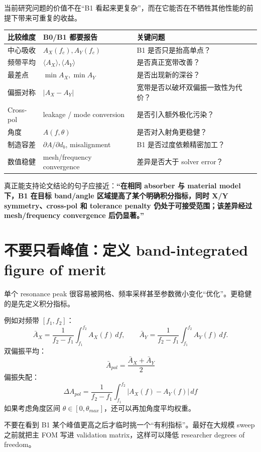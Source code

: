\documentclass[11pt,a4paper,openany]{ctexrep}
\begin{document}
当前研究问题的价值不在“B1 看起来更复杂”，而在它能否在不牺牲其他性能的前提下带来可重复的收益。

\begin{center}
\begin{tabularx}{\textwidth}{p{3.3cm}X X}
\toprule
比较维度 & B0/B1 都要报告 & 关键问题 \\
\midrule
中心吸收 & $A_X(f_c),A_Y(f_c)$ & B1 是否只是抬高单点？ \\
频带平均 & $\langle A_X\rangle,\langle A_Y\rangle$ & 是否真正宽带改善？ \\
最差点 & $\min A_X,\min A_Y$ & 是否出现新的深谷？ \\
偏振对称 & $|A_X-A_Y|$ & 宽带是否以破坏双偏振一致性为代价？ \\
Cross-pol & leakage / mode conversion & 是否引入额外极化污染？ \\
角度 & $A(f,\theta)$ & 是否对入射角更稳健？ \\
制造容差 & $\partial A/\partial d_b$, misalignment & B1 是否过度依赖精密加工？ \\
数值稳健 & mesh/frequency convergence & 差异是否大于 solver error？ \\
\bottomrule
\end{tabularx}
\end{center}

\begin{projectbox}
真正能支持论文结论的句子应接近：\textbf{“在相同 absorber 与 material model 下，B1 在目标 band/angle 区域提高了某个明确积分指标，同时 X/Y symmetry、cross-pol 和 tolerance penalty 仍处于可接受范围；该差异经过 mesh/frequency convergence 后仍显著。”}
\end{projectbox}

\section{不要只看峰值：定义 band-integrated figure of merit}

单个 resonance peak 很容易被网格、频率采样甚至参数微小变化“优化”。更稳健的是先定义积分指标。

例如对频带 $[f_1,f_2]$：
\[
\bar A_X=\frac{1}{f_2-f_1}\int_{f_1}^{f_2}A_X(f)\,df,
\qquad
\bar A_Y=\frac{1}{f_2-f_1}\int_{f_1}^{f_2}A_Y(f)\,df.
\]
双偏振平均：
\[
\boxed{
\bar A_{pol}=\frac{\bar A_X+\bar A_Y}{2}
}
\]
偏振失配：
\[
\boxed{
\Delta A_{pol}=\frac{1}{f_2-f_1}
\int_{f_1}^{f_2}|A_X(f)-A_Y(f)|\,df
}
\]
如果考虑角度区间 $\theta\in[0,\theta_{max}]$，还可以再加角度平均权重。

\begin{mistakebox}
不要在看到 B1 某个峰值更高之后才临时挑一个“有利指标”。最好在大规模 sweep 之前就把主 FOM 写进 validation matrix，这样可以降低 researcher degrees of freedom。
\end{mistakebox}
\end{document}
